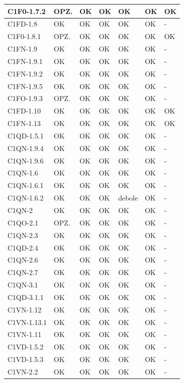 \begin{footnotesize}
\begin{longtable}{|p{}|p{2cm}|p{2cm}|p{2cm}|p{2cm}|p{}|p{2cm}|}
 C1F0-1.7.2&  OPZ.&  OK&  OK&  OK&  OK& OK\\ \hline
 C1FD-1.8&  OK&  OK&  OK&  OK&  OK& -\\ \hline
 C1F0-1.8.1&  OPZ.&  OK&  OK&  OK&  OK& OK\\ \hline
 C1FN-1.9&  OK&  OK&  OK&  OK&  OK& -\\ \hline
 C1FN-1.9.1&  OK&  OK&  OK&  OK&  OK& -\\ \hline
 C1FN-1.9.2&  OK&  OK&  OK&  OK&  OK& -\\ \hline
 C1FN-1.9.5&  OK&  OK&  OK&  OK&  OK& -\\ \hline
 C1FO-1.9.3&  OPZ.&  OK&  OK&  OK&  OK& -\\ \hline
 C1FD-1.10&  OK&  OK&  OK&  OK&  OK& OK\\ \hline
 C1FN-1.13&  OK&  OK&  OK&  OK&  OK& OK\\ \hline
 C1QD-1.5.1&  OK&  OK&  OK&  OK&  OK& -\\ \hline
 C1QN-1.9.4&  OK&  OK&  OK&  OK&  OK& -\\ \hline
 C1QN-1.9.6&  OK&  OK&  OK&  OK&  OK& -\\ \hline
 C1QN-1.6&  OK&  OK&  OK&  OK&  OK& -\\ \hline
 C1QN-1.6.1&  OK&  OK&  OK&  OK&  OK& -\\ \hline
 C1QN-1.6.2&  OK&  OK&  OK&  debole&  OK& -\\ \hline
 C1QN-2&  OK&  OK&  OK&  OK&  OK& -\\ \hline
 C1QO-2.1&  OPZ.&  OK&  OK&  OK&  OK& -\\ \hline
 C1QN-2.3&  OK&  OK&  OK&  OK&  OK& -\\ \hline
 C1QD-2.4&  OK&  OK&  OK&  OK&  OK& -\\ \hline
 C1QN-2.6&  OK&  OK&  OK&  OK&  OK& -\\ \hline
 C1QN-2.7&  OK&  OK&  OK&  OK&  OK& -\\ \hline
 C1QN-3.1&  OK&  OK&  OK&  OK&  OK& -\\ \hline
 C1QD-3.1.1&  OK&  OK&  OK&  OK&  OK& -\\ \hline
 C1VN-1.12&  OK&  OK&  OK&  OK&  OK& -\\ \hline
 C1VN-1.13.1&  OK&  OK&  OK&  OK&  OK& -\\ \hline
 C1VN-1.11&  OK&  OK&  OK&  OK&  OK& -\\ \hline
 C1VD-1.5.2&  OK&  OK&  OK&  OK&  OK& -\\ \hline
 C1VD-1.5.3&  OK&  OK&  OK&  OK&  OK& -\\ \hline
 C1VN-2.2&  OK&  OK&  OK&  OK&  OK& -\\ \hline

\end{longtable}
\end{footnotesize}
